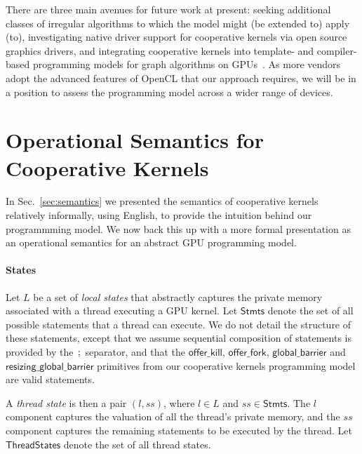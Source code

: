 \documentclass[numbers,nocopyrightspace,10pt]{sigplanconf}
\newcommand{\mysec}{Sec.~}
\newcommand{\code}[1]{\lstset{basicstyle=\tt}\lstinline!#1!\lstset{basicstyle=\scriptsize\tt}}
\newcommand{\offerfork}{\mathsf{offer\_fork}}
\newcommand{\offerkill}{\mathsf{offer\_kill}}
\newcommand{\globalbarrier}{\mathsf{global\_barrier}}
\newcommand{\resizingglobalbarrier}{\mathsf{resizing\_global\_barrier}}
\begin{document}
There are three main avenues for future work at present: seeking
additional classes of irregular algorithms to which the model might
(be extended to) apply (to), investigating native driver support for
cooperative kernels via open source graphics drivers, and integrating
cooperative kernels into template- and compiler-based programming
models for graph algorithms on
GPUs~\cite{DBLP:conf/ppopp/WangDPWRO16,DBLP:conf/oopsla/PaiP16}.  As more vendors
adopt the advanced features of OpenCL that our approach requires, we
will be in a position to assess the programming model across a wider
range of devices.

\clearpage




\clearpage

\appendix

\section{Operational Semantics for Cooperative Kernels}\label{appendix:semantics}

\newcommand{\myss}{\mathit{ss}}
\newcommand{\Stmts}{\mathsf{Stmts}}
\newcommand{\threadstates}{\mathsf{ThreadStates}}
\newcommand{\sharedstates}{\mathsf{SharedStates}}
\newcommand{\sync}{\mathsf{sync}}

In \mysec\ref{sec:semantics} we presented the semantics of cooperative
kernels relatively informally, using English, to provide the intuition
behind our programmming model.  We now back this up with a more formal
presentation as an operational semantics for an abstract GPU
programming model.

\paragraph{States}

Let $L$ be a set of \emph{local states} that abstractly captures the
private memory associated with a thread executing a GPU kernel.  Let
$\Stmts$ denote the set of all possible statements that a
thread can execute.  We do not detail the structure of these
statements, except that we assume sequential composition of statements
is provided by the $\code{;}$ separator, and that the $\offerkill$,
$\offerfork$, $\globalbarrier$ and $\resizingglobalbarrier$ primitives
from our cooperative kernels programming model are valid statements.

A \emph{thread state} is then a pair $(l, \myss)$, where $l \in L$ and
$\myss \in \Stmts$.  The $l$ component captures the valuation of all the
thread's private memory, and the $\myss$ component captures the
remaining statements to be executed by the thread.  Let $\threadstates$ denote the set of all thread states.
\end{document}

